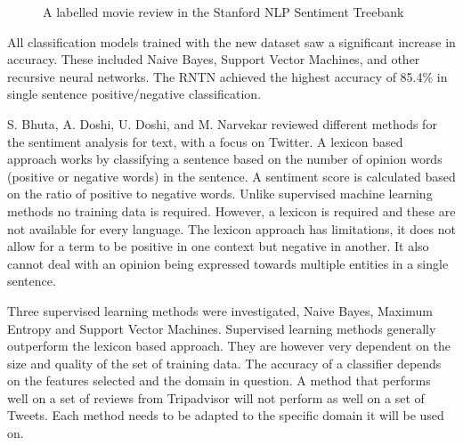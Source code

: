 \begin{figure}
    \centering
    \setlength{\fboxsep}{0pt}
    \setlength{\fboxrule}{0.01pt}
    \setlength{\belowcaptionskip}{-20pt}
    \caption{A labelled movie review in the Stanford NLP Sentiment Treebank \cite{stanfordSentiment2013}}
\end{figure}

All classification models trained with the new dataset saw a significant increase in accuracy. These included Naive Bayes, Support Vector Machines, and other recursive neural networks. The RNTN achieved the highest accuracy of 85.4\% in single sentence positive/negative classification.

S. Bhuta, A. Doshi, U. Doshi, and M. Narvekar \cite{Bhuta2014} reviewed different methods for the sentiment analysis for text, with a focus on Twitter. A lexicon based approach works by classifying a sentence based on the number of opinion words (positive or negative words) in the sentence. A sentiment score is calculated based on the ratio of positive to negative words. Unlike supervised machine learning methods no training data is required. However, a lexicon is required and these are not available for every language. The lexicon approach has limitations, it does not allow for a term to be positive in one context but negative in another. It also cannot deal with an opinion being expressed towards multiple entities in a single sentence.

Three supervised learning methods were investigated, Naive Bayes, Maximum Entropy and Support Vector Machines. Supervised learning methods generally outperform the lexicon based approach. They are however very dependent on the size and quality of the set of training data. The accuracy of a classifier depends on the features selected and the domain in question. A method that performs well on a set of reviews from Tripadvisor will not perform as well on a set of Tweets. Each method needs to be adapted to the specific domain it will be used on.

